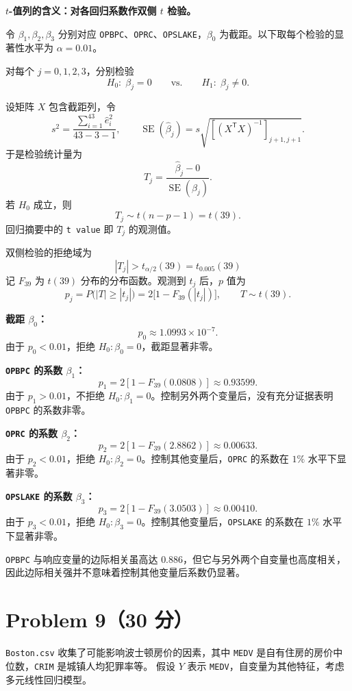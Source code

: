 \documentclass[12pt,a4paper]{article}
\begin{document}
\begin{answerbox}
\textbf{$t$-值列的含义：对各回归系数作双侧 $t$ 检验。}

令 $\beta_1,\beta_2,\beta_3$ 分别对应 \texttt{OPBPC}、\texttt{OPRC}、\texttt{OPSLAKE}，$\beta_0$ 为截距。以下取每个检验的显著性水平为 $\alpha=0.01$。

对每个 $j=0,1,2,3$，分别检验
$$
H_0:\;\beta_j=0
\qquad\text{vs.}\qquad
H_1:\;\beta_j\neq0.
$$

设矩阵 $X$ 包含截距列，令
$$
s^2=\frac{\sum_{i=1}^{43}\hat e_i^2}{43-3-1},
\qquad
\operatorname{SE}(\hat\beta_j)
=s\sqrt{\left[(X^{\mathsf T}X)^{-1}\right]_{j+1,j+1}}.
$$
于是检验统计量为
$$
T_j=\frac{\hat\beta_j-0}{\operatorname{SE}(\hat\beta_j)}.
$$
若 $H_0$ 成立，则
$$
T_j\sim t(n-p-1)=t(39).
$$
回归摘要中的 \texttt{t value} 即 $T_j$ 的观测值。


双侧检验的拒绝域为
$$
|T_j|>t_{\alpha/2}(39)=t_{0.005}(39)
$$
记 $F_{39}$ 为 $t(39)$ 分布的分布函数。观测到 $t_j$ 后，$p$ 值为
$$
p_j=P\bigl(|T|\ge|t_j|\bigr)
=2\bigl[1-F_{39}(|t_j|)\bigr],\qquad T\sim t(39).
$$

\textbf{截距 $\beta_0$：}
$$
p_0\approx1.0993\times10^{-7}.
$$
由于 $p_0<0.01$，拒绝 $H_0:\beta_0=0$，截距显著非零。

\textbf{\texttt{OPBPC} 的系数 $\beta_1$：}
$$
p_1=2[1-F_{39}(0.0808)]\approx0.93599.
$$
由于 $p_1>0.01$，不拒绝 $H_0:\beta_1=0$。控制另外两个变量后，没有充分证据表明 \texttt{OPBPC} 的系数非零。

\textbf{\texttt{OPRC} 的系数 $\beta_2$：}
$$
p_2=2[1-F_{39}(2.8862)]\approx0.00633.
$$
由于 $p_2<0.01$，拒绝 $H_0:\beta_2=0$。控制其他变量后，\texttt{OPRC} 的系数在 $1\%$ 水平下显著非零。

\textbf{\texttt{OPSLAKE} 的系数 $\beta_3$：}
$$
p_3=2[1-F_{39}(3.0503)]\approx0.00410.
$$
由于 $p_3<0.01$，拒绝 $H_0:\beta_3=0$。控制其他变量后，\texttt{OPSLAKE} 的系数在 $1\%$ 水平下显著非零。

\texttt{OPBPC} 与响应变量的边际相关虽高达 $0.886$，但它与另外两个自变量也高度相关，因此边际相关强并不意味着控制其他变量后系数仍显著。
\end{answerbox}


\section{Problem 9（30 分）}

\texttt{Boston.csv} 收集了可能影响波士顿房价的因素，其中
\texttt{MEDV} 是自有住房的房价中位数，\texttt{CRIM} 是城镇人均犯罪率等。
假设 $Y$ 表示 \texttt{MEDV}，自变量为其他特征，考虑多元线性回归模型。
\end{document}
